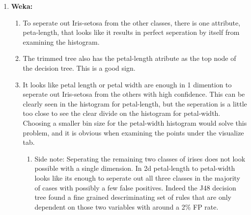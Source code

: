 \documentclass[12pt]{article}
\begin{document}
\begin{enumerate}
\item \textbf{Weka: }

\begin{enumerate}
\item To seperate out Iris-setosa from the other classes, there is one attribute,
peta-length, that looks like it results in perfect seperation by itself
from examining the histogram.
\item The trimmed tree also has the petal-length atribute as the top node
of the decision tree. This is a good sign.
\item It looks like petal length or petal width are enough in 1 dimention
to seperate out Iris-setosa from the others with high confidence.
This can be clearly seen in the histogram for petal-length, but the
seperation is a little too close to see the clear divide on the histogram
for petal-width. Choosing a smaller bin size for the petal-width histogram
would solve this problem, and it is obvious when examining the points
under the visualize tab.

\begin{enumerate}
\item Side note: Seperating the remaining two classes of irises does not
look possible with a single dimension. In 2d petal-length to petal-width
looks like its enough to seperate out all three classes in the majority
of cases with possibly a few false positives. Indeed the J48 decision
tree found a fine grained descriminating set of rules that are only
dependent on those two variables with around a 2\% FP rate.\end{enumerate}
\end{enumerate}
\end{enumerate}
\end{document}
